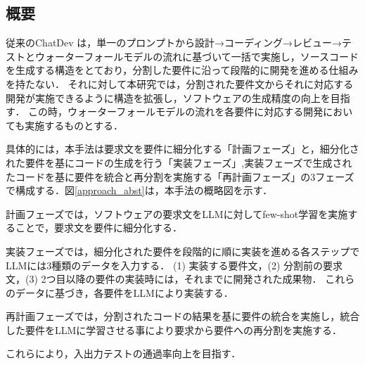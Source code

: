 \documentclass[submit,techrep,noauthor]{ipsj}
\begin{document}
\subsection{概要}
従来のChatDev\cite{qian-etal-2024-chatdev} は，単一のプロンプトから設計→コーディング→レビュー→テストとウォーターフォールモデルの流れに基づいて一括で実施し，ソースコードを生成する構造をとており，分割した要件に沿って段階的に開発を進める仕組みを持たない．
それに対して本研究では，分割された要件文からそれに対応する開発が実施できるように構造を拡張し，ソフトウェアの生成精度の向上を目指す．
この時，ウォーターフォールモデルの流れを各要件に対応する開発においても実施するものとする．

具体的には，本手法は要求文を要件に細分化する「計画フェーズ」と，細分化された要件を基にコードの生成を行う「実装フェーズ」,実装フェーズで生成されたコードを基に要件を統合と再分割を実施する「再計画フェーズ」の3フェーズで構成する．図\ref{approach_abst}は，本手法の概略図を示す．

計画フェーズでは，ソフトウェアの要求文をLLMに対してfew-shot学習を実施することで，要求文を要件に細分化する．

実装フェーズでは，細分化された要件を段階的に順に実装を進める各ステップでLLMには3種類のデータを入力する．
(1) 実装する要件文，(2) 分割前の要求文，(3) 2つ目以降の要件の実装時には，それまでに開発された成果物．
これらのデータに基づき，各要件をLLMにより実装する．

再計画フェーズでは，分割されたコードの結果を基に要件の統合を実施し，統合した要件をLLMに学習させる事により要求から要件への再分割を実施する．

これらにより，入出力テストの通過率向上を目指す．



\end{document}
